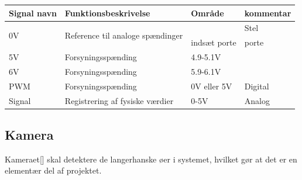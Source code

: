 \begin{center}
		\begin{longtable}{ | m{2cm} | m{6cm}| m{2cm}| m{4.5cm}| } 
			\hline
			\textbf{Signal navn} &\textbf{Funktionsbeskrivelse} &\textbf{Område} &\textbf{kommentar}\\ 
			\hline
			\multirow{2}{*}{0V} & \multirow{2}{*}{Reference til analoge spændinger} &  & Stel \\ 
& & indsæt porte& porte \\	
			\hline	
			5V & Forsyningsspænding & 4.9-5.1V &  \\ 
			\hline
			6V & Forsyningsspænding & 5.9-6.1V &  \\ 
			\hline
			PWM & Forsyningsspænding & 0V eller 5V & Digital \\ 
			\hline	
			Signal & Registrering af fysiske værdier & 0-5V & Analog \\ 
			\hline	
		\end{longtable}
	\end{center}

\newpage
\subsection{Kamera}
\label{subsec:Kamera}
Kameraet[\citet{DH2}] skal detektere de langerhanske øer i systemet, hvilket gør at det er en elementær del af projektet.

